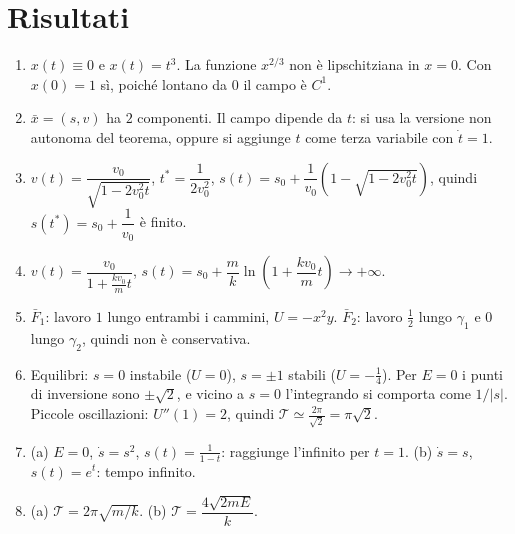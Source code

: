 \documentclass[11pt, a4paper, openright]{book}
\theoremstyle{plain}
\theoremstyle{definition}
\theoremstyle{remark}
\begin{document}
\section*{Risultati}
\begin{enumerate}
    \item[\ref{es:mu1}.] $x(t) \equiv 0$ e $x(t) = t^3$. La funzione $x^{2/3}$ non è lipschitziana in $x = 0$. Con $x(0) = 1$ sì, poiché lontano da $0$ il campo è $C^1$.
    \item[\ref{es:mu2}.] $\bar{x} = (s, v)$ ha $2$ componenti. Il campo dipende da $t$: si usa la versione non autonoma del teorema, oppure si aggiunge $t$ come terza variabile con $\dot{t} = 1$.
    \item[\ref{es:mu3}.] $v(t) = \dfrac{v_0}{\sqrt{1 - 2v_0^2 t}}$, $t^* = \dfrac{1}{2v_0^2}$, $s(t) = s_0 + \dfrac{1}{v_0}\left(1 - \sqrt{1 - 2v_0^2 t}\right)$, quindi $s(t^*) = s_0 + \dfrac{1}{v_0}$ è finito.
    \item[\ref{es:mu4}.] $v(t) = \dfrac{v_0}{1 + \frac{k v_0}{m}t}$, $s(t) = s_0 + \dfrac{m}{k}\ln\left(1 + \dfrac{k v_0}{m}t\right) \to +\infty$.
    \item[\ref{es:mu5}.] $\bar{F}_1$: lavoro $1$ lungo entrambi i cammini, $U = -x^2 y$. $\bar{F}_2$: lavoro $\frac{1}{2}$ lungo $\gamma_1$ e $0$ lungo $\gamma_2$, quindi non è conservativa.
    \item[\ref{es:mu6}.] Equilibri: $s = 0$ instabile ($U = 0$), $s = \pm 1$ stabili ($U = -\frac{1}{4}$). Per $E = 0$ i punti di inversione sono $\pm\sqrt{2}$, e vicino a $s = 0$ l'integrando si comporta come $1/|s|$. Piccole oscillazioni: $U''(1) = 2$, quindi $\mathcal{T} \simeq \frac{2\pi}{\sqrt{2}} = \pi\sqrt{2}$.
    \item[\ref{es:mu7}.] (a) $E = 0$, $\dot{s} = s^2$, $s(t) = \frac{1}{1 - t}$: raggiunge l'infinito per $t = 1$. (b) $\dot{s} = s$, $s(t) = e^t$: tempo infinito.
    \item[\ref{es:mu8}.] (a) $\mathcal{T} = 2\pi\sqrt{m/k}$. (b) $\mathcal{T} = \dfrac{4\sqrt{2mE}}{k}$.
\end{enumerate}
\end{document}
